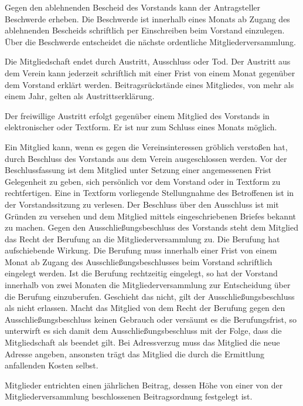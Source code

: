 \documentclass[parskip]{scrartcl}
\begin{document}
\begin{contract}
Gegen den ablehnenden Bescheid des Vorstands kann der Antragsteller Beschwerde erheben. Die Beschwerde ist innerhalb eines Monats ab Zugang des ablehnenden Bescheids schriftlich per Einschreiben beim Vorstand einzulegen. Über die Beschwerde entscheidet die nächste ordentliche Mitgliederversammlung.


Die Mitgliedschaft endet durch Austritt, Ausschluss oder Tod. Der Austritt aus dem Verein kann jederzeit schriftlich mit einer Frist von einem Monat gegenüber dem Vorstand erklärt werden. Beitragsrückstände eines Mitgliedes, von mehr als einem Jahr, gelten als Austrittserklärung.

Der freiwillige Austritt erfolgt gegenüber einem Mitglied des Vorstands in elektronischer oder Textform. Er ist nur zum Schluss eines Monats möglich.

Ein Mitglied kann, wenn es gegen die Vereinsinteressen gröblich verstoßen hat, durch Beschluss des Vorstands aus dem Verein ausgeschlossen werden. Vor der Beschlussfassung ist dem Mitglied unter Setzung einer angemessenen Frist Gelegenheit zu geben, sich persönlich vor dem Vorstand oder in Textform zu rechtfertigen. Eine in Textform vorliegende Stellungnahme des Betroffenen ist in der Vorstandssitzung zu verlesen. Der Beschluss über den Ausschluss ist mit Gründen zu versehen und dem Mitglied mittels eingeschriebenen Briefes bekannt zu machen. Gegen den Ausschließungsbeschluss des Vorstands steht dem Mitglied das Recht der Berufung an die Mitgliederversammlung zu. Die Berufung hat aufschiebende Wirkung. Die Berufung muss innerhalb einer Frist von einem Monat ab Zugang des Ausschließungsbeschlusses beim Vorstand schriftlich eingelegt werden. Ist die Berufung rechtzeitig eingelegt, so hat der Vorstand innerhalb von zwei Monaten die Mitgliederversammlung zur Entscheidung über die Berufung einzuberufen. Geschieht das nicht, gilt der Ausschließungsbeschluss als nicht erlassen. Macht das Mitglied von dem Recht der Berufung gegen den Ausschließungsbeschluss keinen Gebrauch oder versäumt es die Berufungsfrist, so unterwirft es sich damit dem Ausschließungsbeschluss mit der Folge, dass die Mitgliedschaft als beendet gilt.
Bei Adressverzug muss das Mitglied die neue Adresse angeben, ansonsten trägt das
Mitglied die durch die Ermittlung anfallenden Kosten selbst. 


Mitglieder entrichten einen jährlichen Beitrag, dessen Höhe von einer von der Mitgliederversammlung beschlossenen Beitragsordnung festgelegt ist.


\end{contract}
\end{document}
